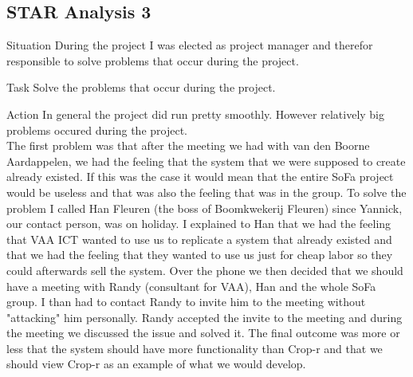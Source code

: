 \documentclass[12pt]{article}
\begin{document}
	\subsection{STAR Analysis 3}
	\begin{STAR}
	    \item[Situation] During the project I was elected as project manager and therefor responsible to solve problems that occur during the project.
	    \item[Task] Solve the problems that occur during the project.
	    \item[Action] In general the project did run pretty smoothly. However relatively big problems occured during the project.\\
	    The first problem was that after the meeting we had with van den Boorne Aardappelen, we had the feeling that the system that we were supposed to create already existed. If this was the case it would mean that the entire SoFa project would be useless and that was also the feeling that was in the group. To solve the problem I called Han Fleuren (the boss of Boomkwekerij Fleuren) since Yannick, our contact person, was on holiday. I explained to Han that we had the feeling that VAA ICT wanted to use us to replicate a system that already existed and that we had the feeling that they wanted to use us just for cheap labor so they could afterwards sell the system. Over the phone we then decided that we should have a meeting with Randy (consultant for VAA), Han and the whole SoFa group. I than had to contact Randy to invite him to the meeting without "attacking" him personally. Randy accepted the invite to the meeting and during the meeting we discussed the issue and solved it. The final outcome was more or less that the system should have more functionality than Crop-r and that we should view Crop-r as an example of what we would develop.
	    

\end{STAR}
\end{document}
